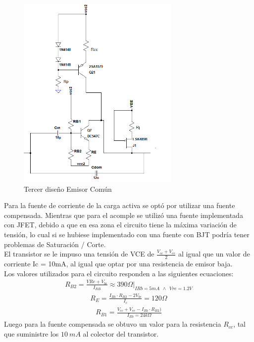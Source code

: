  \begin{figure}[H]
\centering
	\includegraphics[width=0.7\textwidth]{ImagenesGain-Stage/ec3.png}
	\caption{Tercer diseño Emisor Común}
	\label{fig:ec3}
\end{figure}

Para la fuente de corriente de la carga activa se optó por utilizar una fuente compensada. Mientras que para el acomple se utilizó una fuente implementada con JFET, debido a que en esa zona el circuito tiene la máxima variación de tensión, lo cual si se hubiese implementado con una fuente con BJT podría tener problemas de Saturación / Corte.\\
El transistor se le impuso una tensión de VCE de $\frac{V_{cc}+V_{ee}}{2}$ al igual que un valor de corriente Ic = 10mA, al igual que optar por una resistencia de emisor baja.\\
Los valores utilizados para el circuito responden a las siguientes ecuaciones:
\begin{align}
R_{B2}= \frac{V{Re}+V_{be}}{I_{RB}} \approx 390 \Omega |_{IRb=5mA \  \ \wedge \ \  Vre=1.2V}
\end{align}
\begin{align}
R_E=\frac{I_{Rb}\cdot R_{B2}-2V_{be}}{I_c}=120\Omega
\end{align}
\begin{align}
R_{B1}= \frac{V_{cc}+V_{ee}-I_{Rb}\cdot R_{B2}) }{I_{Rb}=24k\Omega}
\end{align}
Luego para la fuente compensada se obtuvo un valor para la resistencia $R_{cc}$, tal que suministre los $10 \ mA$ al colector del transistor.

